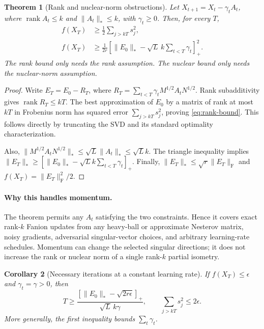 \documentclass[11pt]{article}
\newtheorem{theorem}{Theorem}[section]
\newtheorem{corollary}[theorem]{Corollary}
\newcommand{\F}[1]{\lVert #1\rVert_{\mathrm F}}
\newcommand{\nuc}[1]{\lVert #1\rVert_*}
\newcommand{\rank}{\operatorname{rank}}
\newcommand{\pos}[1]{[#1]_+}
\begin{document}
\begin{theorem}[Rank and nuclear-norm obstructions]\label{thm:barriers}
Let $X_{t+1}=X_t-\gamma_t A_t$, where $\rank A_t\leq k$ and
$\nuc{A_t}\leq k$, with $\gamma_t\geq0$. Then, for every $T$,
\begin{align}
 f(X_T)&\geq \frac12\sum_{j>kT}s_j^2,
 \label{eq:rank-bound}\\
 f(X_T)&\geq\frac{1}{2r}
  \pos{\nuc{E_0}-\sqrt L\,k\sum_{t<T}\gamma_t}^{\!2}.
 \label{eq:nuclear-bound}
\end{align}
The rank bound only needs the rank assumption. The nuclear bound only needs
the nuclear-norm assumption.
\end{theorem}
\begin{proof}
Write $E_T=E_0-R_T$, where
$R_T=\sum_{t<T}\gamma_t M^{1/2}A_tN^{1/2}$. Rank subadditivity gives
$\rank R_T\leq kT$. The best approximation of $E_0$ by a matrix of rank at
most $kT$ in Frobenius norm has squared error $\sum_{j>kT}s_j^2$, proving
\eqref{eq:rank-bound}. This follows directly by truncating the SVD and its
standard optimality characterization.

Also, $\nuc{M^{1/2}A_tN^{1/2}}\leq\sqrt L\nuc{A_t}\leq\sqrt Lk$.
The triangle inequality implies
$\nuc{E_T}\geq\pos{\nuc{E_0}-\sqrt L k\sum_{t<T}\gamma_t}$.
Finally, $\nuc{E_T}\leq\sqrt r\F{E_T}$ and $f(X_T)=\F{E_T}^2/2$.
\end{proof}

\paragraph{Why this handles momentum.}
The theorem permits any $A_t$ satisfying the two constraints. Hence it covers
exact rank-$k$ Fanion updates from any heavy-ball or approximate Nesterov
matrix, noisy gradients, adversarial singular-vector choices, and arbitrary
learning-rate schedules. Momentum can change the selected singular
directions; it does not increase the rank or nuclear norm of a single
rank-$k$ partial isometry.

\begin{corollary}[Necessary iterations at a constant learning rate]
If $f(X_T)\leq\epsilon$ and $\gamma_t=\gamma>0$, then
\begin{equation}\label{eq:necessary-T}
 T\geq
 \frac{\pos{\nuc{E_0}-\sqrt{2r\epsilon}}}{\sqrt L\,k\gamma},
 \qquad
 \sum_{j>kT}s_j^2\leq2\epsilon.
\end{equation}
More generally, the first inequality bounds $\sum_t\gamma_t$.
\end{corollary}
\end{document}
